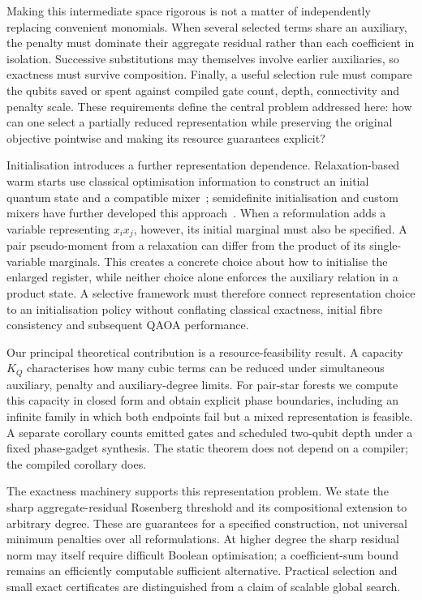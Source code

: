 \documentclass[a4paper,onecolumn,11pt,unpublished]{quantumarticle}
\theoremstyle{remark}
\begin{document}
Making this intermediate space rigorous is not a matter of independently
replacing convenient monomials. When several selected terms share an
auxiliary, the penalty must dominate their aggregate residual rather than each
coefficient in isolation. Successive substitutions may themselves involve
earlier auxiliaries, so exactness must survive composition. Finally, a useful
selection rule must compare the qubits saved or spent against compiled gate
count, depth, connectivity and penalty scale. These requirements define the
central problem addressed here: how can one select a partially reduced
representation while preserving the original objective pointwise and making
its resource guarantees explicit?

Initialisation introduces a further representation dependence.
Relaxation-based warm starts use classical optimisation information to
construct an initial quantum state and a compatible
mixer~\cite{Egger2021}; semidefinite initialisation and custom mixers have
further developed this approach~\cite{TateSDP2023,TateCustom2023}.
When a reformulation adds a variable representing $x_i x_j$, however, its
initial marginal must also be specified. A pair pseudo-moment from a
relaxation can differ from the product of its single-variable marginals.
This creates a concrete choice about how to initialise the enlarged
register, while neither choice alone enforces the auxiliary relation in a
product state. A selective framework must therefore connect representation
choice to an initialisation policy without conflating classical exactness,
initial fibre consistency and subsequent QAOA performance.

Our principal theoretical contribution is a resource-feasibility result. A capacity $K_Q$ characterises how many cubic terms can be reduced under simultaneous auxiliary, penalty and auxiliary-degree limits. For pair-star forests we compute this capacity in closed form and obtain explicit phase boundaries, including an infinite family in which both endpoints fail but a mixed representation is feasible. A separate corollary counts emitted gates and scheduled two-qubit depth under a fixed phase-gadget synthesis. The static theorem does not depend on a compiler; the compiled corollary does.

The exactness machinery supports this representation problem. We state the sharp aggregate-residual Rosenberg threshold and its compositional extension to arbitrary degree. These are guarantees for a specified construction, not universal minimum penalties over all reformulations. At higher degree the sharp residual norm may itself require difficult Boolean optimisation; a coefficient-sum bound remains an efficiently computable sufficient alternative. Practical selection and small exact certificates are distinguished from a claim of scalable global search.
\end{document}
